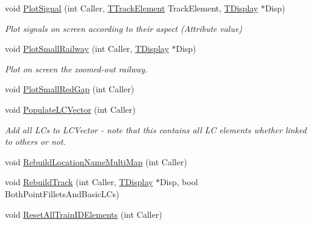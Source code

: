 \begin{DoxyCompactItemize}
\item 
\mbox{\label{class_t_track_aa5742fbc2eb3f8743dde84005499f89e}} 
void \mbox{\hyperlink{class_t_track_aa5742fbc2eb3f8743dde84005499f89e}{Plot\+Signal}} (int Caller, \mbox{\hyperlink{class_t_track_element}{T\+Track\+Element}} Track\+Element, \mbox{\hyperlink{class_t_display}{T\+Display}} $\ast$Disp)
\begin{DoxyCompactList}\small\item\em Plot signals on screen according to their aspect (Attribute value) \end{DoxyCompactList}\item 
\mbox{\label{class_t_track_af654985aa4d1c17684f91474fa03ed98}} 
void \mbox{\hyperlink{class_t_track_af654985aa4d1c17684f91474fa03ed98}{Plot\+Small\+Railway}} (int Caller, \mbox{\hyperlink{class_t_display}{T\+Display}} $\ast$Disp)
\begin{DoxyCompactList}\small\item\em Plot on screen the zoomed-\/out railway. \end{DoxyCompactList}\item 
void \mbox{\hyperlink{class_t_track_ab831c2f47850f3a89678491475d52d29}{Plot\+Small\+Red\+Gap}} (int Caller)
\item 
\mbox{\label{class_t_track_a9a476cd9b32a351de87591f3db2ddb99}} 
void \mbox{\hyperlink{class_t_track_a9a476cd9b32a351de87591f3db2ddb99}{Populate\+L\+C\+Vector}} (int Caller)
\begin{DoxyCompactList}\small\item\em Add all L\+Cs to L\+C\+Vector -\/ note that this contains all LC elements whether linked to others or not. \end{DoxyCompactList}\item 
void \mbox{\hyperlink{class_t_track_a4a948544c9ac877232ec721db8bfc914}{Rebuild\+Location\+Name\+Multi\+Map}} (int Caller)
\item 
void \mbox{\hyperlink{class_t_track_afbd25aa0deb973061c8500a4509136e0}{Rebuild\+Track}} (int Caller, \mbox{\hyperlink{class_t_display}{T\+Display}} $\ast$Disp, bool Both\+Point\+Fillets\+And\+Basic\+L\+Cs)
\item 
void \mbox{\hyperlink{class_t_track_a9430d0a48a27e59f41015c5812aa5de2}{Reset\+All\+Train\+I\+D\+Elements}} (int Caller)
\item 
\mbox{\label{class_t_track_ac416bb4b69d75d4c5c0303a2cadd52ca}} 

\end{DoxyCompactItemize}
